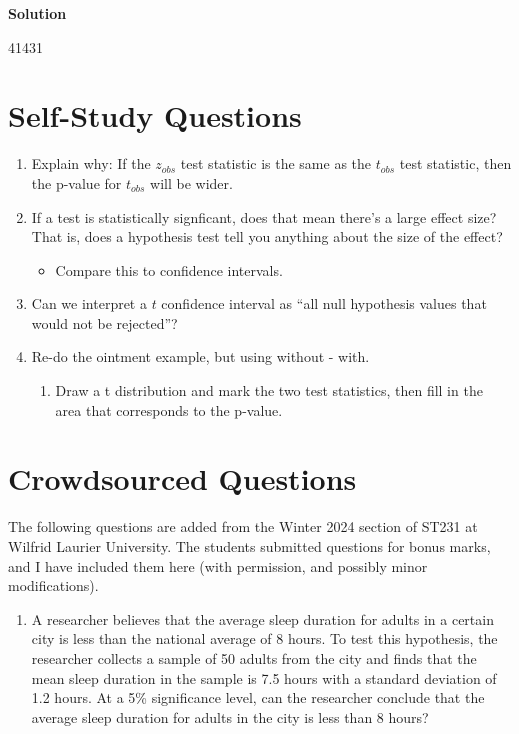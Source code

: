 \documentclass[
  letterpaper,
  DIV=11,
  numbers=noendperiod,
  oneside]{scrreprt}
\providecommand{\tightlist}{%
  \setlength{\itemsep}{0pt}\setlength{\parskip}{0pt}}\usepackage{longtable,booktabs,array}
\begin{document}
\textbf{Solution}

41431

\hypertarget{self-study-questions-6}{%
\section{Self-Study Questions}\label{self-study-questions-6}}

\begin{enumerate}
\def\labelenumi{\arabic{enumi}.}
\tightlist
\item
  Explain why: If the \(z_{obs}\) test statistic is the same as the
  \(t_{obs}\) test statistic, then the p-value for \(t_{obs}\) will be
  wider.
\item
  If a test is statistically signficant, does that mean there's a large
  effect size? That is, does a hypothesis test tell you anything about
  the size of the effect?

  \begin{itemize}
  \tightlist
  \item
    Compare this to confidence intervals.
  \end{itemize}
\item
  Can we interpret a \(t\) confidence interval as ``all null hypothesis
  values that would not be rejected''?
\item
  Re-do the ointment example, but using without - with.

  \begin{enumerate}
  \def\labelenumii{\alph{enumii}.}
  \tightlist
  \item
    Draw a t distribution and mark the two test statistics, then fill in
    the area that corresponds to the p-value.
  \end{enumerate}
\end{enumerate}

\hypertarget{crowdsourced-questions-10}{%
\section{Crowdsourced Questions}\label{crowdsourced-questions-10}}

The following questions are added from the Winter 2024 section of ST231
at Wilfrid Laurier University. The students submitted questions for
bonus marks, and I have included them here (with permission, and
possibly minor modifications).

\begin{enumerate}
\def\labelenumi{\arabic{enumi}.}
\tightlist
\item
  A researcher believes that the average sleep duration for adults in a
  certain city is less than the national average of 8 hours. To test
  this hypothesis, the researcher collects a sample of 50 adults from
  the city and finds that the mean sleep duration in the sample is 7.5
  hours with a standard deviation of 1.2 hours. At a 5\% significance
  level, can the researcher conclude that the average sleep duration for
  adults in the city is less than 8 hours?
\end{enumerate}
\end{document}
